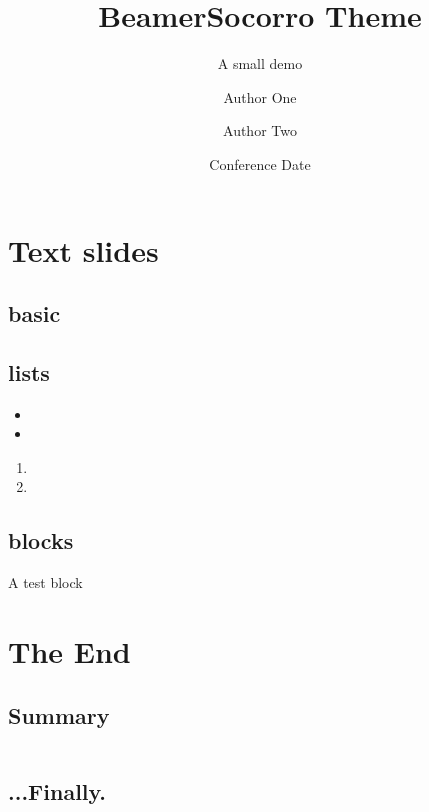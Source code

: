 \documentclass[11pt]{beamer}
\title[Short Title]{BeamerSocorro Theme}
\subtitle{A small demo}
\author[1,*]{Author One}
\author[2,**]{Author Two}
\affil[1]{Place One}
\affil[2]{Place Two}
\date{Conference Date}
\begin{document}
\titleslide
{}

\section{Text slides}
\subsection{basic}
\begin{frame}{\secname}
    \lipsum[1][1-6]   
    \lipsum[1][1] 
\end{frame}

\subsection{lists}
\begin{frame}{\secname}
    \begin{itemize}
        \item \lipsum[1][1]   
        \item \lipsum[1][2]
    \end{itemize}
    \begin{enumerate}
        \item \lipsum[1][1]   
        \item \lipsum[1][2]
    \end{enumerate}
\end{frame}

\subsection{blocks}
\begin{frame}{\secname}
    \begin{block}{A test block}
        \lipsum[1][1] 
    \end{block}
\end{frame}

\section{The End}
\subsection{Summary}
\begin{frame}{\secname}
    \begin{columns}[t]
        \begin{column}{.5\textwidth}
            \lipsum[1][1-3]   
        \end{column}
        \begin{column}{.5\textwidth}
            \lipsum[1][3-6] 
        \end{column}
    \end{columns}
\end{frame}
\subsection*{...Finally.}
\end{document}
